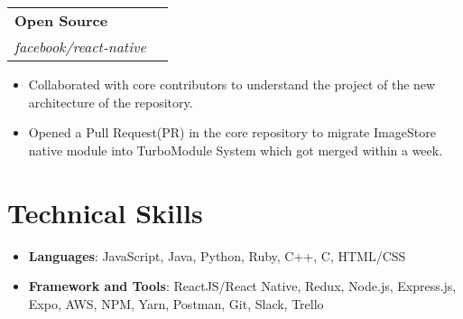 \documentclass[letterpaper, 10pt]{article}
\makeatletter
\newcommand{\resumeItem}[2]{
  \item\small{
    \textbf{#1}{#2 \vspace{-2pt}}
  }
}
\newcommand{\resumeSubheading}[4]{
  \vspace{-1pt}\item
    \begin{tabular*}{0.97\textwidth}{l@{\extracolsep{\fill}}r}
      \textbf{#1} & #2 \\
      \textit{\small#3} & \textit{\small #4} \\
    \end{tabular*}\vspace{-5pt}
}
\newcommand{\resumeSubHeadingListStart}{\begin{itemize}[leftmargin=*]}
\newcommand{\resumeSubHeadingListEnd}{\end{itemize}}
\newcommand{\resumeItemListStart}{\begin{itemize}}
\makeatother
\begin{document}
      
      
     \resumeSubheading
      {Open Source}{}
      {facebook/react-native}{}
      \resumeItemListStart
      \resumeItem{}
          {Collaborated with core contributors to understand the project of the new architecture of the repository.}
      \resumeItem{}
          {Opened a Pull Request(PR) in the core repository to migrate ImageStore native module into TurboModule System which got merged within a week.}
  \resumeSubHeadingListEnd

\section{Technical Skills}
 \resumeSubHeadingListStart
   \item{
     \textbf{Languages}{: JavaScript, Java, Python, Ruby, C++, C, HTML/CSS}
    }
 \resumeSubHeadingListEnd
 
 \resumeSubHeadingListStart
    \item{
     \textbf{Framework and Tools}{: ReactJS/React Native, Redux, Node.js, Express.js, Expo, AWS, NPM, Yarn, Postman, Git, Slack, Trello }
    }
 \resumeSubHeadingListEnd
\end{document}
